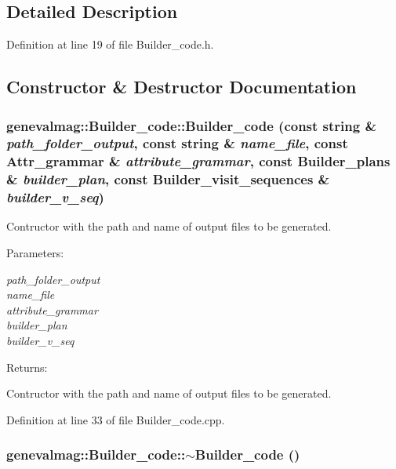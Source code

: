\subsection{Detailed Description}


Definition at line 19 of file Builder\_\-code.h.

\subsection{Constructor \& Destructor Documentation}
\hypertarget{classgenevalmag_1_1Builder__code_0d3743b15ad07d8e8cbe40a8fece97bf}{
\subsubsection[{Builder\_\-code}]{\setlength{\rightskip}{0pt plus 5cm}genevalmag::Builder\_\-code::Builder\_\-code (const string \& {\em path\_\-folder\_\-output}, \/  const string \& {\em name\_\-file}, \/  const {\bf Attr\_\-grammar} \& {\em attribute\_\-grammar}, \/  const {\bf Builder\_\-plans} \& {\em builder\_\-plan}, \/  const {\bf Builder\_\-visit\_\-sequences} \& {\em builder\_\-v\_\-seq})}}
\label{classgenevalmag_1_1Builder__code_0d3743b15ad07d8e8cbe40a8fece97bf}


Contructor with the path and name of output files to be generated. \begin{Desc}
\item[Parameters:]
\begin{description}
\item[{\em path\_\-folder\_\-output}]\item[{\em name\_\-file}]\item[{\em attribute\_\-grammar}]\item[{\em builder\_\-plan}]\item[{\em builder\_\-v\_\-seq}]\end{description}
\end{Desc}
\begin{Desc}
\item[Returns:]\end{Desc}
Contructor with the path and name of output files to be generated. 

Definition at line 33 of file Builder\_\-code.cpp.\hypertarget{classgenevalmag_1_1Builder__code_9e6e4ec3399e378cc691e69d7ab5c278}{
\subsubsection[{$\sim$Builder\_\-code}]{\setlength{\rightskip}{0pt plus 5cm}genevalmag::Builder\_\-code::$\sim$Builder\_\-code ()}}
\label{classgenevalmag_1_1Builder__code_9e6e4ec3399e378cc691e69d7ab5c278}


